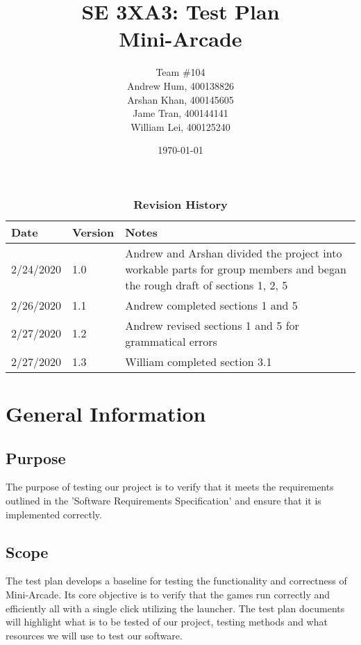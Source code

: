 \documentclass[12pt, titlepage]{article}
\title{SE 3XA3: Test Plan\\Mini-Arcade}
\author{Team \#104
		\\ Andrew Hum, 400138826
		\\ Arshan Khan, 400145605
		\\ Jame Tran, 400144141
		\\ William Lei, 400125240
}
\date{\today}
\begin{document}
\maketitle

\tableofcontents
\listoftables
\listoffigures

\begin{table}[bp]
\caption{\bf Revision History}
\begin{tabularx}{\textwidth}{p{3cm}p{2cm}X}
\toprule {\bf Date} & {\bf Version} & {\bf Notes}\\
\midrule
2/24/2020 & 1.0 & Andrew and Arshan divided the project into workable parts for group members and began the rough draft of sections 1, 2, 5\\
2/26/2020 & 1.1 & Andrew completed sections 1 and 5\\
2/27/2020 & 1.2 & Andrew revised sections 1 and 5 for grammatical errors\\
2/27/2020 & 1.3 & William completed section 3.1\\
\bottomrule
\end{tabularx}
\end{table}

\newpage


\section{General Information}

\subsection{Purpose}

The purpose of testing our project is to verify that it meets the requirements outlined in the 'Software Requirements Specification' and ensure that it is implemented correctly.

\subsection{Scope}

The test plan develops a baseline for testing the functionality and correctness of Mini-Arcade. Its core objective is to verify that the games run correctly and efficiently all with a single click utilizing the launcher. The test plan documents will highlight what is to be tested of our project, testing methods and what resources we will use to test our software.
\end{document}
